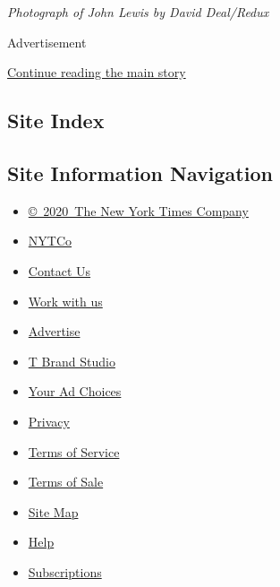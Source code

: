 \emph{Photograph of John Lewis by David Deal/Redux}

Advertisement

\protect\hyperlink{after-bottom}{Continue reading the main story}

\hypertarget{site-index}{%
\subsection{Site Index}\label{site-index}}

\hypertarget{site-information-navigation}{%
\subsection{Site Information
Navigation}\label{site-information-navigation}}

\begin{itemize}
\tightlist
\item
  \href{https://help.nytimes3xbfgragh.onion/hc/en-us/articles/115014792127-Copyright-notice}{©~2020~The
  New York Times Company}
\end{itemize}

\begin{itemize}
\tightlist
\item
  \href{https://www.nytco.com/}{NYTCo}
\item
  \href{https://help.nytimes3xbfgragh.onion/hc/en-us/articles/115015385887-Contact-Us}{Contact
  Us}
\item
  \href{https://www.nytco.com/careers/}{Work with us}
\item
  \href{https://nytmediakit.com/}{Advertise}
\item
  \href{http://www.tbrandstudio.com/}{T Brand Studio}
\item
  \href{https://www.nytimes3xbfgragh.onion/privacy/cookie-policy\#how-do-i-manage-trackers}{Your
  Ad Choices}
\item
  \href{https://www.nytimes3xbfgragh.onion/privacy}{Privacy}
\item
  \href{https://help.nytimes3xbfgragh.onion/hc/en-us/articles/115014893428-Terms-of-service}{Terms
  of Service}
\item
  \href{https://help.nytimes3xbfgragh.onion/hc/en-us/articles/115014893968-Terms-of-sale}{Terms
  of Sale}
\item
  \href{https://spiderbites.nytimes3xbfgragh.onion}{Site Map}
\item
  \href{https://help.nytimes3xbfgragh.onion/hc/en-us}{Help}
\item
  \href{https://www.nytimes3xbfgragh.onion/subscription?campaignId=37WXW}{Subscriptions}
\end{itemize}
